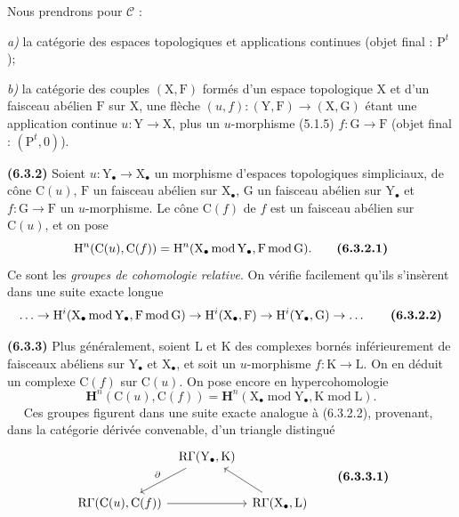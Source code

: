 \documentclass[11pt,leqno]{article}
\newcommand{\Page}[1]{\ifvmode\noindent\else\unskip\ \fi{\footnotesize\textcolor{gray}{[p.\,#1]}}\ \ignorespaces}
\begin{document}
Nous prendrons pour \(\mathscr{C}\) :

\noindent
\textit{a)} la catégorie des espaces topologiques et applications continues (objet final : \(\mathrm{P}^{t}\));

\noindent
\textit{b)} la catégorie des couples \((\mathrm{X},\mathrm{F})\) formés d’un espace topologique \(\mathrm{X}\) et d’un faisceau abélien \(\mathrm{F}\) sur \(\mathrm{X}\), une flèche \((u,f):(\mathrm{Y},\mathrm{F})\to(\mathrm{X},\mathrm{G})\) étant une application continue \(u:\mathrm{Y}\to\mathrm{X}\), plus un \(u\)-morphisme (5.1.5) \(f:\mathrm{G}\to\mathrm{F}\) (objet final : \((\mathrm{P}^{t},0)\)).

\textbf{(6.3.2)} Soient \(u:\mathrm{Y}_{\bullet}\to\mathrm{X}_{\bullet}\) un morphisme d’espaces topologiques simpliciaux, de cône \(\mathrm{C}(u)\), \(\mathrm{F}\) un faisceau abélien sur \(\mathrm{X}_{\bullet}\), \(\mathrm{G}\) un faisceau abélien sur \(\mathrm{Y}_{\bullet}\) et \(f:\mathrm{G}\to\mathrm{F}\) un \(u\)-morphisme. Le cône \(\mathrm{C}(f)\) de \(f\) est un faisceau abélien sur \(\mathrm{C}(u)\), et on pose
\[
\mathrm{H}^{n}(\mathrm{C}(u),\mathrm{C}(f))
=\mathrm{H}^{n}(\mathrm{X}_{\bullet}\operatorname{mod}\mathrm{Y}_{\bullet},
\mathrm{F}\operatorname{mod}\mathrm{G}).
\tag*{\textbf{(6.3.2.1)}}
\]
Ce sont les \textit{groupes de cohomologie relative}. On vérifie facilement qu’ils s’insèrent dans une suite exacte longue
\[
\ldots\to
\mathrm{H}^{i}(\mathrm{X}_{\bullet}\operatorname{mod}\mathrm{Y}_{\bullet},
\mathrm{F}\operatorname{mod}\mathrm{G})
\to\mathrm{H}^{i}(\mathrm{X}_{\bullet},\mathrm{F})
\to\mathrm{H}^{i}(\mathrm{Y}_{\bullet},\mathrm{G})
\to\ldots
\tag*{\textbf{(6.3.2.2)}}
\]

\textbf{(6.3.3)} Plus généralement, soient \(\mathrm{L}\) et \(\mathrm{K}\) des complexes bornés inférieurement de faisceaux abéliens sur \(\mathrm{Y}_{\bullet}\) et \(\mathrm{X}_{\bullet}\), et soit un \(u\)-morphisme \(f:\mathrm{K}\to\mathrm{L}\). On en déduit un complexe \(\mathrm{C}(f)\) sur \(\mathrm{C}(u)\). On pose encore en hypercohomologie
\[
\mathbf{H}^{n}(\mathrm{C}(u),\mathrm{C}(f))
=\mathbf{H}^{n}(\mathrm{X}_{\bullet}\operatorname{mod}\mathrm{Y}_{\bullet},
\mathrm{K}\operatorname{mod}\mathrm{L}).
\]
\Page{22}
Ces groupes figurent dans une suite exacte analogue à (6.3.2.2), provenant, dans la catégorie dérivée convenable, d’un triangle distingué
\[
\begin{tikzcd}[column sep=0.5em,row sep=2em]
& \mathrm{R}\Gamma(\mathrm{Y}_{\bullet},\mathrm{K})
  \arrow[dl,"\partial"'] & \\
\mathrm{R}\Gamma(\mathrm{C}(u),\mathrm{C}(f)) \arrow[rr]
& & \mathrm{R}\Gamma(\mathrm{X}_{\bullet},\mathrm{L}) \arrow[ul]
\end{tikzcd}
\tag*{\textbf{(6.3.3.1)}}
\]
\end{document}
